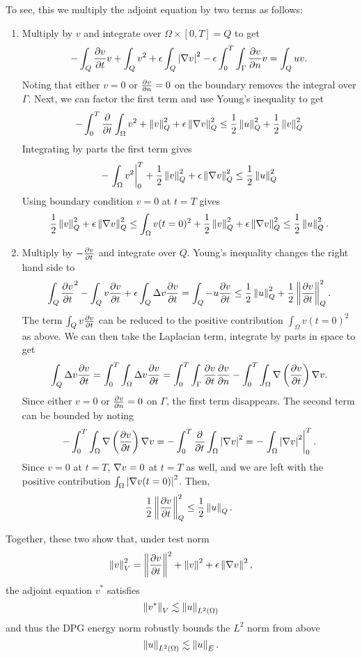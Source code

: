 \documentclass{article}
\begin{document}
To see, this we multiply the adjoint equation by two terms as follows:
\begin{enumerate}
\item Multiply by $v$ and integrate over $\Omega \times [0,T] = Q$ to get
\[
-\int_Q \frac{\partial v}{\partial t}v + \int_Q v^2 + \epsilon \int_Q \left| \nabla v \right|^2 - \epsilon \int_0^T\int_{\Gamma} \frac{\partial v}{\partial n}v = \int_Q uv.
\]
Noting that either $v = 0$ or $\frac{\partial v}{\partial n} = 0$ on the boundary removes the integral over $\Gamma$.  Next, we can factor the first term and use Young's inequality to get
\[
-\int_0^T  \frac{\partial}{\partial t}\int_{\Omega} v^2 + \left\| v \right\|^2_Q + \epsilon \left\| \nabla v \right\|^2_Q \leq \frac{1}{2}\left\| u \right\|^2_Q + \frac{1}{2}\left\| v \right\|^2_Q
\]
Integrating by parts the first term gives
\[
-\left.\int_{\Omega} v^2\right|_0^T + \frac{1}{2}\left\| v \right\|^2_Q + \epsilon \left\| \nabla v \right\|^2_Q \leq \frac{1}{2}\left\| u \right\|^2_Q
\]
Using boundary condition $v=0$ at $t= T$ gives
\[
\frac{1}{2}\left\| v \right\|^2_Q + \epsilon \left\| \nabla v \right\|^2_Q \leq \int_{\Omega} v(t=0)^2 + \frac{1}{2}\left\| v \right\|^2_Q + \epsilon \left\| \nabla v \right\|^2_Q \leq \frac{1}{2}\left\| u \right\|^2_Q.
\]

\item Multiply by $-\frac{\partial v}{\partial t}$ and integrate over $Q$.  Young's inequality changes the right hand side to 
\[
\int_Q\frac{\partial v}{\partial t}^2 - \int_Q v\frac{\partial v}{\partial t} + \epsilon\int_Q \Delta v \frac{\partial v}{\partial t} = \int_Q -u \frac{\partial v}{\partial t} \leq \frac{1}{2}\left\| u \right\|_Q^2 + \frac{1}{2}\left\| \frac{\partial v}{\partial t} \right\|_Q^2 .
\]
The term $\int_Q v\frac{\partial v}{\partial t}$ can be reduced to the positive contribution $\int_{\Omega}{v(t=0)}^2  $ as above.  We can then take the Laplacian term, integrate by parts in space to get
\[
\int_Q \Delta v \frac{\partial v}{\partial t} = \int_0^T \int_{\Omega} \Delta v \frac{\partial v}{\partial t} =  \int_0^T \int_{\Gamma} \frac{\partial v}{\partial t}\frac{\partial v}{\partial n} - \int_0^T \int_{\Omega}\nabla\left( \frac{\partial v}{\partial t} \right)\nabla v.
\]
Since either $v = 0$ or $\frac{\partial v}{\partial n} = 0$ on $\Gamma$, the first term disappears.  The second term can be bounded by noting
\[
- \int_0^T \int_{\Omega}\nabla\left( \frac{\partial v}{\partial t} \right)\nabla v = - \int_0^T \frac{\partial}{\partial t}\int_{\Omega}\left| \nabla v \right| ^2 = - \left.\int_{\Omega}\left| \nabla v \right|^2 \right|_0^T.
\]
Since $v = 0$ at $t=T$, $\nabla v = 0$ at $t=T$ as well, and we are left with the positive contribution $\int_{\Omega}\left| \nabla v(t=0) \right|^2$.  Then,
\[
\frac{1}{2}\left\| \frac{\partial v}{\partial t} \right\|_Q^2 \leq \frac{1}{2}\left\| u \right\|_Q.
\]
\end{enumerate}
Together, these two show that, under test norm
\[
\left\| v \right\|_V^2 = \left\| \frac{\partial v}{\partial t} \right\|^2 + \left\| v \right\|^2 + \epsilon\left\| \nabla v \right\|^2,
\]
the adjoint equation $v^*$ satisfies
\[
\left\| v^* \right\|_V \lesssim \left\| u \right\|_{L^2\left( \Omega \right)}
\]
and thus the DPG energy norm robustly bounds the $L^2$ norm from above
\[
\left\| u \right\|_{L^2\left( \Omega \right)} \lesssim \left\| u \right\|_E.
\]
\end{document}

